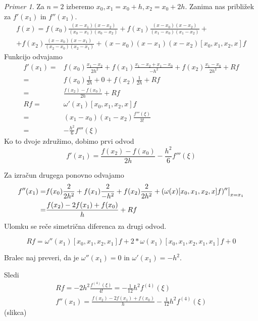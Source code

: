 \documentclass[a4paper,12pt]{article}
\theoremstyle{definition}
\theoremstyle{remark}
\newtheorem*{ex}{Primer}
\newcommand\restr[2]{{%
  \left.\kern-\nulldelimiterspace %
  #1 %
  \littletaller %
  \right|_{#2} %
  }}
\newcommand{\littletaller}{\mathchoice{\vphantom{\big|}}{}{}{}}
\begin{document}
\begin{ex}
    Za $n=2$ izberemo $x_0, x_1=x_0+h, x_2 = x_0+2h$. Zanima nas približek za $f'(x_1)$ in $f''(x_1)$.
    \begin{multline*}
        f(x) = f(x_0) \frac{(x-x_1)(x-x_2)}{(x_0-x_1)(x_0-x_2)} + f(x_1) \frac{(x-x_0)(x-x_2)}{(x_1-x_0)(x_1-x_2)} + \\
        + f(x_2) \frac{(x-x_0)(x-x_1)}{(x_2-x_0)(x_2-x_1)} + (x-x_0)(x-x_1)(x-x_2) [x_0, x_1, x_2, x] f
    \end{multline*}
    Funkcijo odvajamo
    \begin{align*}
        f'(x_1) =& f(x_0) \frac{x_1-x_2}{2h^2} + f(x_1) \frac{x_1-x_2+x_1-x_0}{-h^2} + f(x_2) \frac{x_1-x_0}{2h^2} + Rf \\
                =& f(x_0) \frac{1}{2h} + 0 + f(x_2) \frac{1}{2h} + Rf \\
                =& \frac{f(x_2) - f(x_0)}{2h} + Rf \\
        Rf =& \omega'(x_1) [x_0, x_1, x_2, x] f \\
           =& (x_1 - x_0)(x_1-x_2) \frac{f'''(\xi)}{3!} \\
           =& - \frac{h^2}{6} f'''(\xi)
    \end{align*}
    Ko to dvoje združimo, dobimo prvi odvod
    \begin{equation*}
        f'(x_1) = \frac{f(x_2) - f(x_0)}{2h} - \frac{h^2}{6} f'''(\xi)
    \end{equation*}

    Za izračun drugega ponovno odvajamo
    \begin{align*}
        f''(x_1) =& f(x_0) \frac{2}{2h^2} + f(x_1) \frac{2}{-h^2} + f(x_2) \frac{2}{2h^2} + (\omega(x) [x_0, x_1, x_2, x] f)'' \restr{}{x=x_1} \\
                 =& \frac{f(x_2) - 2 f(x_1) + f(x_0)}{h} + Rf
    \end{align*}
    Ulomku se reče simetrična diferenca za drugi odvod.

    \begin{equation*}
        Rf = \omega''(x_1) [x_0, x_1, x_2, x_1] f + 2*\omega(x_1) [x_0, x_1, x_2, x_1, x_1] f + 0 
    \end{equation*}

    Bralec naj preveri, da je $\omega''(x_1) = 0$ in $\omega'(x_1) = -h^2$.
    
    Sledi
    \begin{gather*}
        Rf = -2h^2 \frac{f^{(4)}(\xi)}{4!} = - \frac{1}{12} h^2 f^{(4)}(\xi)  \\
        f''(x_1) = \frac{f(x_2) - 2 f(x_1) + f(x_0)}{h} - \frac{1}{12} h^2 f^{(4)}(\xi)
    \end{gather*}
    (slikca)
\end{ex}
\end{document}
